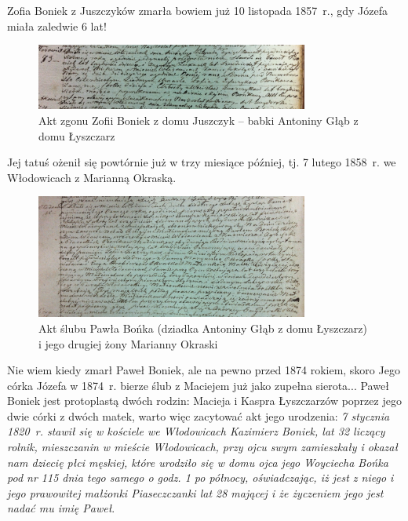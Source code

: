 Zofia Boniek z Juszczyków zmarła bowiem już 10 listopada 1857~r., gdy Józefa miała zaledwie 6 lat!

\begin{figure}[!h]
\begin{center}
\includegraphics[width=0.8\textwidth]{zdjecia/akt_zgonu_zofii_boniek.jpg}
\caption[Akt zgonu Zofii Boniek]{Akt zgonu Zofii Boniek z domu Juszczyk -- babki Antoniny Głąb z domu Łyszczarz}
\label{rys:akt_zgonu_zofii_boniek.jpg}
\end{center}
\end{figure}

Jej tatuś ożenił się powtórnie już w trzy miesiące później, tj. 7 lutego 1858~r. we Włodowicach z Marianną Okraską. 


\begin{figure}[!h]
\begin{center}
\includegraphics[width=0.8\textwidth]{zdjecia/akt_slubu_pawla_bonka_i_marianny_okraski.jpg}
\caption[Akt ślubu Pawła Bońka z Marianną Okraską]{Akt ślubu Pawła Bońka (dziadka Antoniny Głąb z domu Łyszczarz) i jego drugiej żony Marianny Okraski}
\label{rys:akt_slubu_pawla_bonka_i_marianny_okraski}
\end{center}
\end{figure}

Nie wiem kiedy zmarł Paweł Boniek, ale na pewno przed 1874 rokiem, skoro Jego córka Józefa w 1874~r. bierze ślub z Maciejem już jako zupełna sierota...
Paweł Boniek jest protoplastą dwóch rodzin: Macieja i Kaspra Łyszczarzów poprzez jego dwie córki z dwóch matek, warto więc zacytować akt jego urodzenia: \textit{7 stycznia 1820~r. stawił się w kościele we Włodowicach Kazimierz Boniek, lat 32 liczący rolnik, mieszczanin w mieście Włodowicach, przy ojcu swym zamieszkały i okazał nam dziecię płci męskiej, które urodziło się w domu ojca jego Woyciecha Bońka pod  nr 115 dnia tego samego o godz. 1 po północy, oświadczając, iż jest z niego i jego prawowitej małżonki  Piaseczczanki lat 28 mającej i że życzeniem jego jest nadać mu imię Paweł}.

